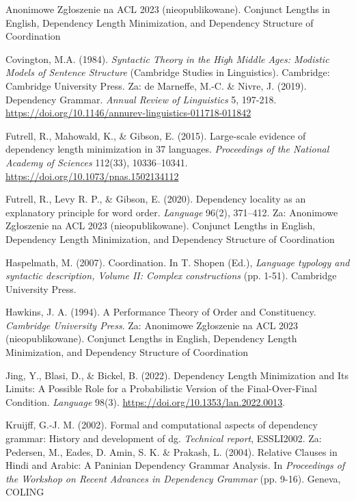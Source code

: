 \documentclass[licencjacka]{pracamgr_Kogni}
\begin{document}
\begin{thebibliography}{99}

Anonimowe Zgłoszenie na ACL 2023 (nieopublikowane). Conjunct Lengths in English, Dependency Length Minimization, and Dependency Structure of Coordination

Covington, M.A. (1984). \textit{Syntactic Theory in the High Middle Ages: Modistic Models of Sentence Structure}
(Cambridge Studies in Linguistics). Cambridge: Cambridge University Press. Za: de Marneffe, M.-C. \& Nivre, J. (2019). Dependency Grammar. \textit{Annual Review of Linguistics} 5, 197-218. \url{https://doi.org/10.1146/annurev-linguistics-011718-011842}

Futrell, R., Mahowald, K., \& Gibson, E. (2015). Large-scale evidence of dependency length minimization in 37 languages. \textit{Proceedings of the National Academy of Sciences} 112(33), 10336–10341. \url{https://doi.org/10.1073/pnas.1502134112}

Futrell, R., Levy R. P., \& Gibson, E. (2020). Dependency locality as an explanatory principle for word order. \textit{Language} 96(2), 371–412. Za: Anonimowe Zgłoszenie na ACL 2023 (nieopublikowane). Conjunct Lengths in English, Dependency Length Minimization, and Dependency Structure of Coordination

Haspelmath, M. (2007). Coordination. In T. Shopen (Ed.), \textit{Language typology and syntactic description, Volume II: Complex constructions} (pp. 1-51). Cambridge University Press.

Hawkins, J. A. (1994). A Performance Theory of Order and Constituency. \textit{Cambridge University Press}. Za: Anonimowe Zgłoszenie na ACL 2023 (nieopublikowane). Conjunct Lengths in English, Dependency Length Minimization, and Dependency Structure of Coordination

Jing, Y., Blasi, D., \& Bickel, B. (2022). Dependency Length Minimization and Its Limits: A Possible Role for a Probabilistic Version of the Final-Over-Final Condition. \textit{Language} 98(3). \url{https://doi.org/10.1353/lan.2022.0013}. 

Kruijff, G.-J. M. (2002). Formal and computational aspects of dependency grammar: History and development of dg. \textit{Technical report}, ESSLI2002. Za: Pedersen, M., Eades, D. Amin, S. K. \& Prakash, L. (2004). Relative Clauses in Hindi and Arabic: A Paninian Dependency Grammar Analysis. In \textit{Proceedings of the Workshop on Recent Advances in Dependency Grammar} (pp. 9-16). Geneva, COLING


\end{thebibliography}
\end{document}
